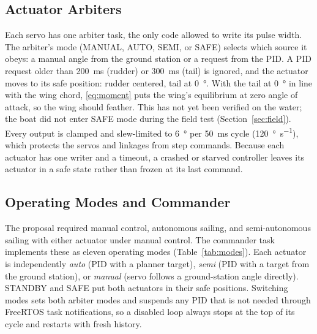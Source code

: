 \subsection{Actuator Arbiters}
Each servo has one arbiter task, the only code allowed to write its pulse
width. The arbiter's mode (MANUAL, AUTO, SEMI, or SAFE) selects which source
it obeys: a manual angle from the ground station or a request from the PID.
A PID request older than \SI{200}{\milli\second} (rudder) or
\SI{300}{\milli\second} (tail) is ignored, and the actuator moves to its safe
position: rudder centered, tail at \SI{0}{\degree}. With the tail at
\SI{0}{\degree} in line with the wing chord, \eqref{eq:moment} puts the
wing's equilibrium at zero angle of attack, so the wing should feather. This
has not yet been verified on the water; the boat did not enter SAFE mode
during the field test (Section~\ref{sec:field}). Every
output is clamped and slew-limited to \SI{6}{\degree} per \SI{50}{\milli\second}
cycle (\SI{120}{\degree\per\second}), which protects the servos and linkages
from step commands. Because each actuator has one writer and a timeout, a
crashed or starved controller leaves its actuator in a safe state rather than
frozen at its last command.

\subsection{Operating Modes and Commander}
The proposal required manual control, autonomous sailing, and semi-autonomous
sailing with either actuator under manual control. The commander task
implements these as eleven operating modes (Table~\ref{tab:modes}). Each
actuator is independently \emph{auto} (PID with a planner target),
\emph{semi} (PID with a target from the ground station), or \emph{manual}
(servo follows a ground-station angle directly). STANDBY and SAFE put both
actuators in their safe positions. Switching modes sets both arbiter modes and
suspends any PID that is not needed through FreeRTOS task notifications, so a
disabled loop always stops at the top of its cycle and restarts with fresh
history.

